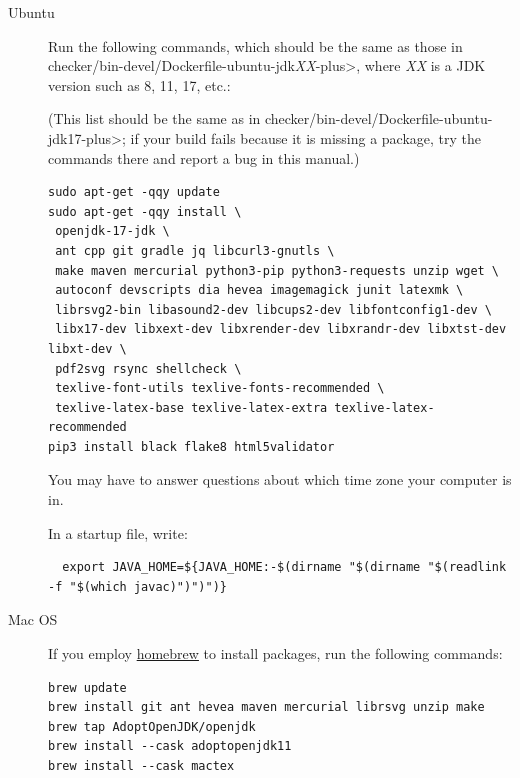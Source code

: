 \begin{description}
\item[Ubuntu]
  Run the following commands, which should be the same as those in
  \<checker/bin-devel/Dockerfile-ubuntu-jdk\emph{XX}-plus>, where \emph{XX}
  is a JDK version such as 8, 11, 17, etc.:

(This list should be the same as in
\<checker/bin-devel/Dockerfile-ubuntu-jdk17-plus>; if your build fails
because it is missing a package, try the commands there and report a bug
in this manual.)


\begin{Verbatim}
sudo apt-get -qqy update
sudo apt-get -qqy install \
 openjdk-17-jdk \
 ant cpp git gradle jq libcurl3-gnutls \
 make maven mercurial python3-pip python3-requests unzip wget \
 autoconf devscripts dia hevea imagemagick junit latexmk \
 librsvg2-bin libasound2-dev libcups2-dev libfontconfig1-dev \
 libx17-dev libxext-dev libxrender-dev libxrandr-dev libxtst-dev libxt-dev \
 pdf2svg rsync shellcheck \
 texlive-font-utils texlive-fonts-recommended \
 texlive-latex-base texlive-latex-extra texlive-latex-recommended
pip3 install black flake8 html5validator
\end{Verbatim}

  You may have to answer questions about which time zone your computer is in.

In a startup file, write:
\begin{smaller}
\begin{Verbatim}
  export JAVA_HOME=${JAVA_HOME:-$(dirname "$(dirname "$(readlink -f "$(which javac)")")")}
\end{Verbatim}
\end{smaller}

\item[Mac OS]
  If you employ \href{https://brew.sh}{homebrew} to install packages, run
  the following commands:

\begin{Verbatim}
brew update
brew install git ant hevea maven mercurial librsvg unzip make
brew tap AdoptOpenJDK/openjdk
brew install --cask adoptopenjdk11
brew install --cask mactex
\end{Verbatim}


\end{description}
